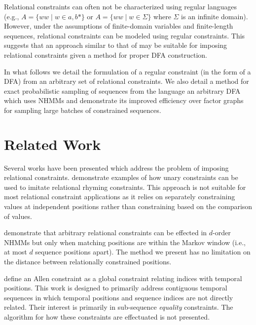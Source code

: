 \documentclass[phd,electronic,oneside,twosidetoc,letterpaper,chaptercenter,parttop,lof,lot]{byumsphd}
\begin{document}
Relational constraints can often not be characterized using regular languages (e.g.,  $A = \{ww\mid w\in{a,b}*\}$ or $A = \{ww\mid w\in\Sigma\}$ where $\Sigma$ is an infinite domain). However, under the assumptions of finite-domain variables and finite-length sequences, relational constraints can be modeled using regular constraints. This suggests that an approach similar to that of \citeauthor{papadopoulos2015exact} \cite{papadopoulos2015exact} may be suitable for imposing relational constraints given a method for proper DFA construction.

In what follows we detail the formulation of a regular constraint (in the form of a DFA) from an arbitrary set of relational constraints. We also detail a method for exact probabilistic sampling of sequences from the language an arbitrary DFA which uses NHMMs and demonstrate its improved efficiency over factor graphs for sampling large batches of constrained sequences. 

\section{Related Work}

Several works have been presented which address the problem of imposing relational constraints. \citeauthor{barbieri2012markov} \cite{barbieri2012markov} demonstrate examples of how unary constraints can be used to imitate relational rhyming constraints. This approach is not suitable for most relational constraint applications as it relies on separately constraining values at independent positions rather than constraining based on the comparison of values. 

\citeauthor{bodily2018floating} \cite{bodily2018floating} demonstrate that arbitrary relational constraints can be effected in $d$-order NHMMs but only when matching positions are within the Markov window (i.e., at most $d$ sequence positions apart). The method we present has no limitation on the distance between relationally constrained positions.

\citeauthor{roy2016enforcing} \cite{roy2016enforcing} define an Allen constraint as a global constraint relating indices with temporal positions. This work is designed to primarily address contiguous temporal sequences in which temporal positions and sequence indices are not directly related. Their interest is primarily in sub-sequence \textit{equality} constraints. The algorithm for how these constraints are effectuated is not presented.
\end{document}
